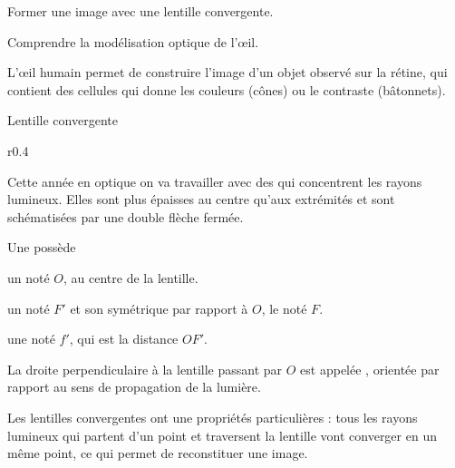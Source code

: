 \teteSndLumi
\vspace*{-30pt}

\vspace*{-12pt}
\begin{objectifs}
  \item Former une image avec une lentille convergente.
  \item Comprendre la modélisation optique de l'œil.
\end{objectifs}

\begin{contexte}
  L’œil humain permet de construire l'image d'un objet observé sur la rétine, qui contient des cellules qui donne les couleurs (cônes) ou le contraste (bâtonnets).
  
\end{contexte}


\begin{doc}{Lentille convergente}
  \begin{wrapfigure}[4]{r}{0.4\linewidth}
    \centering
    \vspace*{-42pt}
  \end{wrapfigure}
  
  Cette année en optique on va travailler avec des  qui concentrent les rayons lumineux.
  Elles sont plus épaisses au centre qu'aux extrémités et sont schématisées par une double flèche fermée.

  \begin{importants}
    Une  possède
    \begin{listePoints}
      \item un  noté $O$, au centre de la lentille. 
      \item un  noté $F'$ et son symétrique par rapport à $O$, le  noté $F$.
      \item une  noté $f'$, qui est la distance $OF'$.
    \end{listePoints}
    
    La droite perpendiculaire à la lentille passant par $O$ est appelée , orientée par rapport au sens de propagation de la lumière.
  \end{importants}

  Les lentilles convergentes ont une propriétés particulières : tous les rayons lumineux qui partent d'un point et traversent la lentille vont converger en un même point, ce qui permet de reconstituer une image.
\end{doc}

